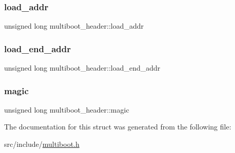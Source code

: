 \subsubsection{\texorpdfstring{load\+\_\+addr}{load\_addr}}
{\footnotesize\ttfamily unsigned long multiboot\+\_\+header\+::load\+\_\+addr}

\mbox{\label{structmultiboot__header_abf9d70f5dace001e3460dcf779ef6876}} 
\subsubsection{\texorpdfstring{load\+\_\+end\+\_\+addr}{load\_end\_addr}}
{\footnotesize\ttfamily unsigned long multiboot\+\_\+header\+::load\+\_\+end\+\_\+addr}

\mbox{\label{structmultiboot__header_ad685c9fda952c9ce602f530e5270eb6b}} 
\subsubsection{\texorpdfstring{magic}{magic}}
{\footnotesize\ttfamily unsigned long multiboot\+\_\+header\+::magic}



The documentation for this struct was generated from the following file\+:\begin{DoxyCompactItemize}
\item 
src/include/\hyperlink{multiboot_8h}{multiboot.\+h}\end{DoxyCompactItemize}
